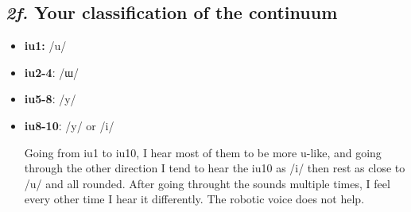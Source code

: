 \documentclass[12pt, english]{article}
\begin{document}
\subsection*{\emph{2f.} Your classification of the continuum}

\begin{itemize}
    \item \textbf{iu1:} /u/
    \item \textbf{iu2-4ː} /ɯ/
    \item \textbf{iu5-8ː} /y/
    \item \textbf{iu8-10ː} /y/ or /i/ \par
    Going from iu1 to iu10, I hear most of them to be more u-like, and going through the other direction I tend to hear the iu10 as /i/ then rest as close to /u/ and all rounded. After going throught the sounds multiple times, I feel every other time I hear it differently. The robotic voice does not help.
\end{itemize}
\end{document}
